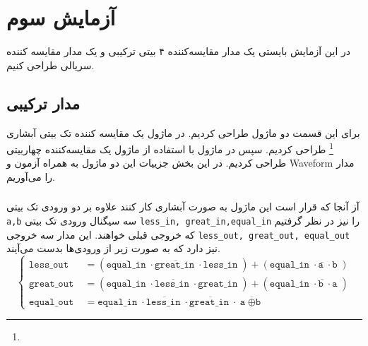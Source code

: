 \documentclass{perassignments}
\renewcommand{\maketitle}{\MakeMyLabTitle}
\newcommand{\vars}[1]{\texttt{#1}}
\newcommand{\varseq}[1]{\texttt{#1} \;}
\begin{document}
	\maketitle
	\section{آزمایش سوم}
	در این آزمایش بایستی یک مدار مقایسه‌کننده ۴ بیتی ترکیبی و یک مدار مقایسه کننده سریالی طراحی کنیم.
	 \subsection{مدار ترکیبی}
	 برای این قسمت دو ماژول طراحی کردیم. در ماژول 
	 یک مقایسه کننده تک بیتی آبشاری
	 \footnote{}
	 طراحی کردیم. سپس در ماژول 
	 با استفاده از ماژول 
	 یک مقایسه‌کننده چهاربیتی طراحی کردیم. در این بخش جزییات این دو ماژول به همراه آزمون و Waveform مدار را می‌آوریم.

	 \subsubsection{}
	 آز آنجا که قرار است این ماژول به صورت آبشاری کار کنند علاوه بر دو ورودی تک بیتی 
	 \vars{a,b}
	 سه سیگنال ورودی تک بیتی
	 \vars{less\_in, great\_in,equal\_in}
	 را نیز در نظر گرفتیم که خروجی قبلی خواهند. این مدار سه خروجی 
	 \vars{less\_out, great\_out, equal\_out}
	 نیز دارد که به صورت زیر از ورودی‌ها بدست می‌آیند.
	 \begin{equation*}
	 	\begin{cases}
	 		\varseq{less\_out} &= (\overline{\varseq{equal\_in}} \cdot \overline{\varseq{great\_in}} \cdot \varseq{less\_in})  + (\varseq{equal\_in}\cdot \overline{\varseq{a}} \cdot \varseq{b})\\
	 		\varseq{great\_out} &= (\overline{\varseq{equal\_in}} \cdot\overline{\varseq{less\_in}}\cdot \varseq{great\_in})  + (\varseq{equal\_in}\cdot \overline{\varseq{b}} \cdot\varseq{a})\\
	 		\varseq{equal\_out} &= \varseq{equal\_in} \cdot \overline{\varseq{less\_in}} \cdot \overline{\varseq{great\_in}}\cdot \overline{\varseq{a} \oplus \varseq{b}}
	 	\end{cases}
	 \end{equation*}
	 \begin{latin}
	 	\raggedleft
	 	
	 \end{latin}
\end{document}
